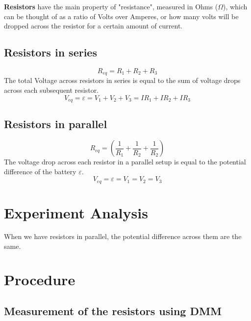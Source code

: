 \documentclass[titlepage]{article}
\begin{document}
    \textbf{Resistors} have the main property of "resistance", measured in Ohms ($\Omega$), which can be thought of as a ratio of Volts over Amperes, or how many volts will be dropped across the resistor for a certain amount of current. 




    \subsection*{Resistors in series}
        $$R_{eq} = R_1 +R_2 + R_3 $$
        The total Voltage across resistors in series is equal to the sum of voltage drops across each subsequent resistor. $$ V_{eq} = \varepsilon = V_1 + V_2 + V_3 = I R_1 + I R_2 + I R_3 $$

    \subsection*{Resistors in parallel} 
        $$R_{eq} = \left( \frac{1}{R_1} + \frac{1}{R_2} + \frac{1}{R_2} \right)  $$
        The voltage drop across each resistor in a parallel setup is equal to the potential difference of the battery $\varepsilon$.
        $$V_{eq} = \varepsilon = V_1 = V_2 = V_3 $$


	\section{Experiment Analysis}
    When we have resistors in parallel, the potential difference across them are the same. 
    



	\section{Procedure}
        \subsection{Measurement of the resistors using DMM}
\end{document}
